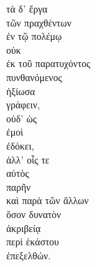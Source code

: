 {\large
\begin{greek}
\noindent τὰ δ' ἔργα \\
\tabto{2em} τῶν πραχθέντων \\
\tabto{2em} ἐν τῷ πολέμῳ \\
οὐκ \\
\tabto{2em} ἐκ τοῦ παρατυχόντος \\
πυνθανόμενος \\
ἠξίωσα \\
\tabto{2em} γράφειν, \\
οὐδ' ὡς \\
\tabto{2em} ἐμοὶ \\
\tabto{2em} ἐδόκει, \\
ἀλλ' οἷς τε \\
\tabto{2em} αὐτὸς \\
\tabto{2em} παρῆν \\
καὶ παρὰ τῶν ἄλλων \\
\tabto{4em} ὅσον δυνατὸν \\
\tabto{2em} ἀκριβείᾳ \\
\tabto{2em} περὶ ἑκάστου \\
ἐπεξελθών.\\

\end{greek}
}

